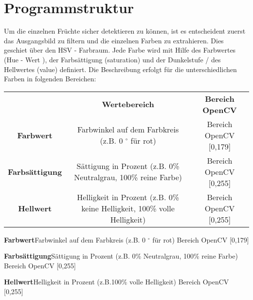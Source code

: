 
\section{Programmstruktur}
\label{sec:Programmstruktur}

Um die einzelnen Früchte sicher detektieren zu können, ist es entscheident zuerst das Ausgangsbild zu filtern und die einzelnen Farben zu extrahieren. Dies geschiet über den HSV - Farbraum. Jede Farbe wird mit Hilfe des Farbwertes (Hue - Wert ), der Farbsättigung (saturation) und der Dunkelstufe / des Hellwertes (value) definiert. Die Beschreibung erfolgt für die unterschiedlichen Farben in folgenden Bereichen:

\begin{center}
\begin{tabular}{ccc}
 & \textbf{Wertebereich} & \textbf{Bereich OpenCV}\\
\textbf{Farbwert} & Farbwinkel auf dem Farbkreis (z.B. 0 $^\circ$ für rot)  & Bereich OpenCV [0,179]\\

\textbf{Farbsättigung} & Sättigung in Prozent (z.B. 0\% Neutralgrau, 100\% reine Farbe) & Bereich OpenCV [0,255]\\

\textbf{Hellwert}  & Helligkeit in Prozent (z.B. 0\% keine Helligkeit, 100\% volle Helligkeit) &  Bereich OpenCV [0,255]\\

\end{tabular}
\end{center}

\textbf{Farbwert}Farbwinkel auf dem Farbkreis (z.B. 0 $^\circ$ für rot)   Bereich OpenCV [0,179]

\textbf{Farbsättigung}Sättigung in Prozent (z.B. 0\% Neutralgrau, 100\% reine Farbe)  Bereich OpenCV [0,255]

\textbf{Hellwert}Helligkeit in Prozent (z.B.100\% volle Helligkeit)   Bereich OpenCV [0,255]



 


